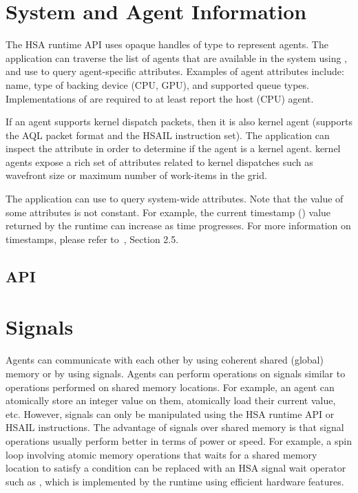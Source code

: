 \documentclass[oneside]{book}
\begin{document}
\section{System and Agent Information}
\label{sec:agentinfo}

The HSA runtime API uses opaque handles of type  to
represent agents. The application can traverse the list of agents that are
available in the system using , and use
 to query agent-specific attributes. Examples of
agent attributes include: name, type of backing device (CPU, GPU), and supported
queue types. Implementations of  are required to at
least report the host (CPU) agent.

If an agent supports kernel dispatch packets, then it is also kernel agent
(supports the AQL packet format and the HSAIL instruction set). The application
can inspect the  attribute in order to determine
if the agent is a kernel agent. kernel agents expose a rich set of
attributes related to kernel dispatches such as wavefront size or maximum number
of work-items in the grid.

The application can use  to query system-wide
attributes. Note that the value of some attributes is not constant. For example,
the current timestamp () value returned by the
runtime can increase as time progresses. For more information on timestamps,
please refer to~\cite{sar}, Section 2.5.

\subsection{API}


\section{Signals}\label{sec:signals}

Agents can communicate with each other by using coherent shared (global)
memory or by using signals. Agents can perform operations on signals similar
to operations performed on shared memory locations. For example, an agent
can atomically store an integer value on them, atomically load their current
value, etc. However, signals can only be manipulated using the HSA runtime API
or HSAIL instructions. The advantage of signals over shared memory is that
signal operations usually perform better in terms of power or speed. For
example, a spin loop involving atomic memory operations that waits for a shared
memory location to satisfy a condition can be replaced with an HSA signal wait
operator such as , which is implemented by the
runtime using efficient hardware features.
\end{document}
